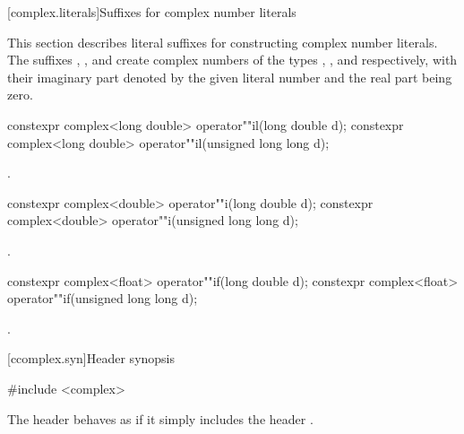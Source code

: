 [complex.literals]{Suffixes for complex number literals}

%
%
\pnum
This section describes literal suffixes for constructing complex number literals.
The suffixes , , and  create complex numbers of
the types , , and
 respectively, with their imaginary part denoted by the
given literal number and the real part being zero.

%
\begin{itemdecl}
constexpr complex<long double> operator""il(long double d);
constexpr complex<long double> operator""il(unsigned long long d);
\end{itemdecl}

\begin{itemdescr}
\pnum
\returns
{}.
\end{itemdescr}

%
\begin{itemdecl}
constexpr complex<double> operator""i(long double d);
constexpr complex<double> operator""i(unsigned long long d);
\end{itemdecl}

\begin{itemdescr}
\pnum
\returns
{}.
\end{itemdescr}

%
\begin{itemdecl}
constexpr complex<float> operator""if(long double d);
constexpr complex<float> operator""if(unsigned long long d);
\end{itemdecl}

\begin{itemdescr}
\pnum
\returns
{}.
\end{itemdescr}

[ccomplex.syn]{Header  synopsis}
%

\begin{codeblock}
#include <complex>
\end{codeblock}

\pnum
The header 
behaves as if it simply includes the header .

